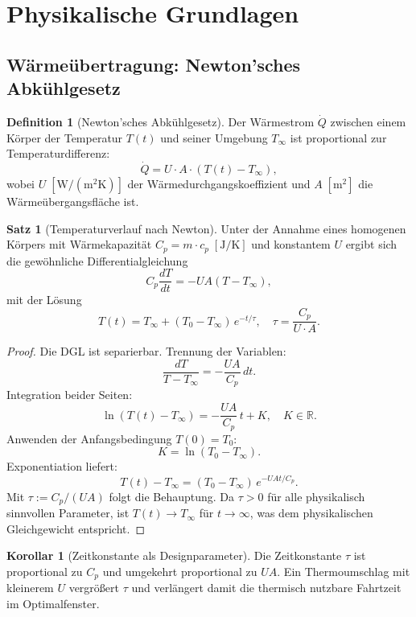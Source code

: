 ﻿\documentclass[a4paper,12pt]{article}
\theoremstyle{definition}
\newtheorem{definition}{Definition}
\newtheorem{satz}{Satz}
\newtheorem{korollar}{Korollar}
\begin{document}
\section{Physikalische Grundlagen}

\subsection{W\"arme\"ubertragung: Newton'sches Abk\"uhlgesetz}

\begin{definition}[Newton'sches Abk\"uhlgesetz]
Der W\"armestrom $\dot{Q}$ zwischen einem K\"orper der Temperatur $T(t)$ und seiner Umgebung $T_\infty$ ist proportional zur Temperaturdifferenz:
\[
  \dot{Q} = U \cdot A \cdot (T(t) - T_\infty),
\]
wobei $U\;[\mathrm{W/(m^2 K)}]$ der W\"armedurchgangskoeffizient und $A\;[\mathrm{m^2}]$ die W\"arme\"ubergangs\-fl\"ache ist.
\end{definition}

\begin{satz}[Temperaturverlauf nach Newton]
\label{satz:newton}
Unter der Annahme eines homogenen K\"orpers mit W\"armekapazit\"at $C_p = m \cdot c_p\;[\mathrm{J/K}]$ und konstantem $U$ ergibt sich die gew\"ohnliche Differentialgleichung
\[
  C_p \frac{dT}{dt} = -U A (T - T_\infty),
\]
mit der L\"osung
\[
  \boxed{T(t) = T_\infty + (T_0 - T_\infty)\,e^{-t/\tau}}, \quad \tau = \frac{C_p}{U \cdot A}.
\]
\end{satz}

\begin{proof}
Die DGL ist separierbar. Trennung der Variablen:
\[
  \frac{dT}{T - T_\infty} = -\frac{UA}{C_p}\,dt.
\]
Integration beider Seiten:
\[
  \ln(T(t) - T_\infty) = -\frac{UA}{C_p}\,t + K,\quad K \in \mathbb{R}.
\]
Anwenden der Anfangsbedingung $T(0) = T_0$:
\[
  K = \ln(T_0 - T_\infty).
\]
Exponentiation liefert:
\[
  T(t) - T_\infty = (T_0 - T_\infty)\,e^{-UA t/C_p}.
\]
Mit $\tau := C_p / (UA)$ folgt die Behauptung. Da $\tau > 0$ f\"ur alle physikalisch sinnvollen Parameter, ist $T(t) \to T_\infty$ f\"ur $t \to \infty$, was dem physikalischen Gleichgewicht entspricht.
\end{proof}

\begin{korollar}[Zeitkonstante als Designparameter]
\label{kor:zeitkonstante}
Die Zeitkonstante $\tau$ ist proportional zu $C_p$ und umgekehrt proportional zu $UA$. Ein Thermoumschlag mit kleinerem $U$ vergr\"o\ss{}ert $\tau$ und verl\"angert damit die thermisch nutzbare Fahrtzeit im Optimalfenster.
\end{korollar}
\end{document}
